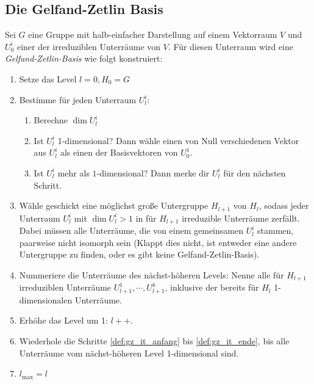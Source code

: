  \subsection{Die Gelfand-Zetlin Basis}
 \begin{definition}
 	\label{def:konstruktion_gz_basis}
	Sei $G$ eine Gruppe mit halb-einfacher Darstellung auf einem Vektorraum $V$ und $U^i_0$ einer der irreduziblen Unterräume von $V$. Für diesen Unterraum wird eine \emph{Gelfand-Zetlin-Basis} wie folgt konstruiert:
	\begin{enumerate}[label={\arabic*.)}]
		\item Setze das Level $l=0, H_0 = G$
		\item Bestimme für jeden Unterraum $U_l^i$: \label{def:gz_it_anfang}
		\begin{enumerate}
			\item Berechne $\dim{U_l^i}$
			\item Ist $U_l^i$ 1-dimensional? Dann wähle einen von Null verschiedenen Vektor aus $U_l^i$ als einen der Basisvektoren von $U^1_0$.
			\item Ist $U_l^i$ mehr als $1$-dimensional? Dann merke dir $U_l^i$ für den nächsten Schritt.
		\end{enumerate}
		\item Wähle geschickt eine möglichst große Untergruppe $H_{l+1}$ von $H_{l}$, sodass jeder Unterraum $U_l^i$ mit $\dim{U_l^i}>1$ in für $H_{l+1}$ irreduzible Unterräume  zerfällt. Dabei müssen alle Unterräume, die von einem gemeinsamen $U_l^i$ stammen, paarweise nicht isomorph sein (Klappt dies nicht, ist entweder eine andere Untergruppe zu finden, oder es gibt keine Gelfand-Zetlin-Basis). \label{def:gz_it_ugschritt}
		\item Nummeriere die Unterräume des nächst-höheren Levels: Nenne alle für $H_{l+1}$ irreduziblen Unterräume $U_{l+1}^{1}, \cdots, U_{l+1}^{k}$, inklusive der bereits für $H_l$ 1-dimensionalen Unterräume.
		\item Erhöhe das Level um 1: $l++$. \label{def:gz_it_ende}
		\item Wiederhole die Schritte \ref{def:gz_it_anfang} bis \ref{def:gz_it_ende}, bis alle Unterräume vom nächst-höheren Level 1-dimensional sind.
		\item $l_{\text{max}} = l$
		\end{enumerate}
\end{definition}
